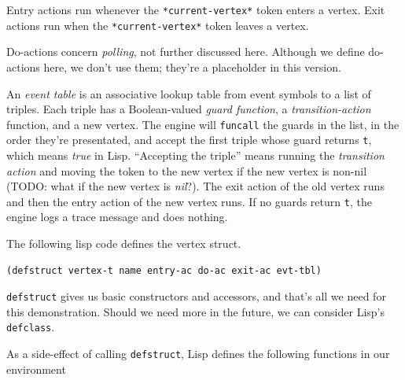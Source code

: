 \documentclass[10pt,oneside,x11names]{article}
\begin{document}
Entry actions run whenever the \texttt{*current-vertex*} token enters a vertex.
Exit actions run when the \texttt{*current-vertex*} token leaves a vertex.

Do-actions concern \emph{polling}, not further discussed here. Although we define
do-actions here, we don't use them; they're a placeholder in this version.

An \emph{event table} is an associative lookup table from event symbols to a list
of triples. Each triple has a Boolean-valued \emph{guard function}, a
\emph{transition-action} function, and a new vertex. The engine will \texttt{funcall} the
guards in the list, in the order they're presentated, and accept the first
triple whose guard returns \texttt{t}, which means \emph{true} in Lisp. ``Accepting the
triple'' means running the \emph{transition action} and moving the token to the new
vertex if the new vertex is non-nil (TODO: what if the new vertex is \emph{nil}?).
The exit action of the old vertex runs and then the entry action of the new
vertex runs. If no guards return \texttt{t}, the engine logs a trace message and does
nothing.

The following lisp code defines the vertex struct.

\begin{verbatim}
(defstruct vertex-t name entry-ac do-ac exit-ac evt-tbl)
\end{verbatim}

\texttt{defstruct} gives us basic constructors and accessors, and that's all we need
for this demonstration. Should we need more in the future, we can consider
Lisp's \texttt{defclass}.

As a side-effect of calling \texttt{defstruct}, Lisp defines the following functions
in our environment
\end{document}
